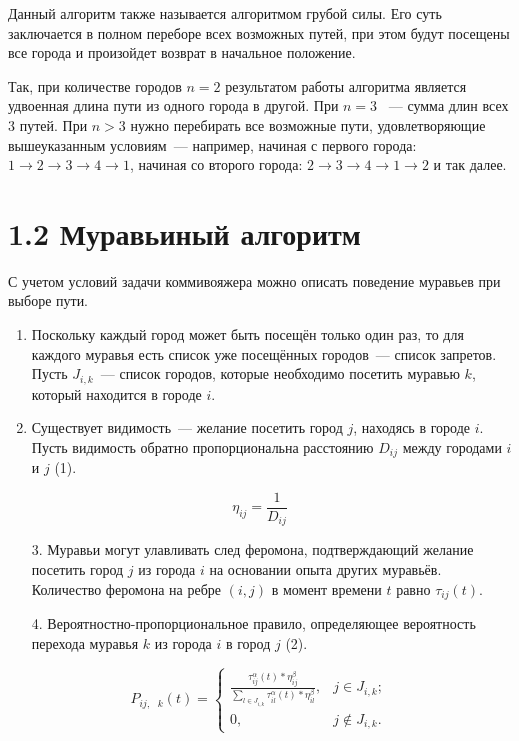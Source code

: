 \documentclass[12pt, a4paper]{report}
\begin{document}
	Данный алгоритм также называется алгоритмом грубой силы. Его суть заключается в полном переборе всех возможных путей, при этом будут посещены все города и произойдет возврат в начальное положение.
	
	Так, при количестве городов $n = 2$ результатом работы алгоритма является удвоенная длина пути из одного города в другой. При $n = 3$ ~--- сумма длин всех 3 путей. При $n > 3$ нужно перебирать все возможные пути, удовлетворяющие вышеуказанным условиям~--- например, начиная с первого города: $1\rightarrow2\rightarrow3\rightarrow4\rightarrow1$, начиная со второго города: $2\rightarrow3\rightarrow4\rightarrow1\rightarrow2$ и так далее.
	
	\section*{1.2 Муравьиный алгоритм}
	
	С учетом условий задачи коммивояжера можно описать поведение муравьев при выборе пути.
	
	\begin{enumerate}
		\item Поскольку каждый город может быть посещён только один раз, то для каждого муравья есть список уже посещённых городов~--- список запретов. Пусть $J_{i, k}$~--- список городов, которые необходимо посетить муравью $k$, который находится в городе $i$.
		\item Существует видимость~--- желание посетить город $j$, находясь в городе $i$. Пусть видимость обратно пропорциональна расстоянию $D_{ij}$ между городами $i$ и $j$ (1).
	\end{enumerate}
	
	\begin{equation}
		{\eta}_{ij} = \frac{1}{D_{ij}}
	\end{equation}
	
	\begin{enumerate}
		\item[3.] Муравьи могут улавливать след феромона, подтверждающий желание посетить город $j$ из города $i$ на основании опыта других муравьёв. Количество феромона на ребре $(i, j)$ в момент времени $t$ равно $\tau_{ij}(t)$.
		\item[4.] Вероятностно-пропорциональное правило, определяющее вероятность перехода муравья $k$ из города $i$ в город $j$ (2).
	\end{enumerate}
	
	\begin{equation}
		P_{ij,\text{ }k}(t) =
		\begin{cases}
			\frac{{\tau}_{ij}^{\alpha}(t) * {\eta}_{ij}^{\beta}}{\displaystyle\sum_{l \in J_{i, k}}^{} {\tau}_{il}^{\alpha}(t) * {\eta}_{il}^{\beta}}, & j \in J_{i, k};
			\\
			0, & j \notin J_{i, k}.
		\end{cases}
	\end{equation}
	
\end{document}
